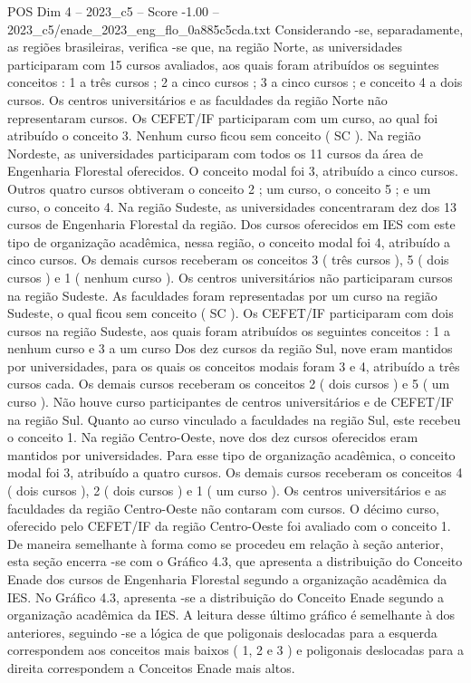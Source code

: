 \begin{textsample}{POS Dim 4 – 2023\_c5 – Score -1.00 – 2023\_c5/enade\_2023\_eng\_flo\_0a885c5cda.txt}
Considerando -se, separadamente, as regiões brasileiras, verifica -se que, na região Norte, as universidades participaram com 15 cursos avaliados, aos quais foram atribuídos os seguintes conceitos : 1 a três cursos ; 2 a cinco cursos ; 3 a cinco cursos ; e conceito 4 a dois cursos.
Os centros universitários e as faculdades da região Norte não representaram cursos.
Os CEFET/IF participaram com um curso, ao qual foi atribuído o conceito 3.
Nenhum curso ficou sem conceito ( SC ).
Na região Nordeste, as universidades participaram com todos os 11 cursos da área de Engenharia Florestal oferecidos.
O conceito modal foi 3, atribuído a cinco cursos.
Outros quatro cursos obtiveram o conceito 2 ; um curso, o conceito 5 ; e um curso, o conceito 4.
Na região Sudeste, as universidades concentraram dez dos 13 cursos de Engenharia Florestal da região.
Dos cursos oferecidos em IES com este tipo de organização acadêmica, nessa região, o conceito modal foi 4, atribuído a cinco cursos.
Os demais cursos receberam os conceitos 3 ( três cursos ), 5 ( dois cursos ) e 1 ( nenhum curso ).
Os centros universitários não participaram cursos na região Sudeste.
As faculdades foram representadas por um curso na região Sudeste, o qual ficou sem conceito ( SC ).
Os CEFET/IF participaram com dois cursos na região Sudeste, aos quais foram atribuídos os seguintes conceitos : 1 a nenhum curso e 3 a um curso Dos dez cursos da região Sul, nove eram mantidos por universidades, para os quais os conceitos modais foram 3 e 4, atribuído a três cursos cada.
Os demais cursos receberam os conceitos 2 ( dois cursos ) e 5 ( um curso ).
Não houve curso participantes de centros universitários e de CEFET/IF na região Sul.
Quanto ao curso vinculado a faculdades na região Sul, este recebeu o conceito 1.
Na região Centro-Oeste, nove dos dez cursos oferecidos eram mantidos por universidades.
Para esse tipo de organização acadêmica, o conceito modal foi 3, atribuído a quatro cursos.
Os demais cursos receberam os conceitos 4 ( dois cursos ), 2 ( dois cursos ) e 1 ( um curso ).
Os centros universitários e as faculdades da região Centro-Oeste não contaram com cursos.
O décimo curso, oferecido pelo CEFET/IF da região Centro-Oeste foi avaliado com o conceito 1.
De maneira semelhante à forma como se procedeu em relação à seção anterior, esta seção encerra -se com o Gráfico 4.3, que apresenta a distribuição do Conceito Enade dos cursos de Engenharia Florestal segundo a organização acadêmica da IES.
No Gráfico 4.3, apresenta -se a distribuição do Conceito Enade segundo a organização acadêmica da IES.
A leitura desse último gráfico é semelhante à dos anteriores, seguindo -se a lógica de que poligonais deslocadas para a esquerda correspondem aos conceitos mais baixos ( 1, 2 e 3 ) e poligonais deslocadas para a direita correspondem a Conceitos Enade mais altos.

\end{textsample}
